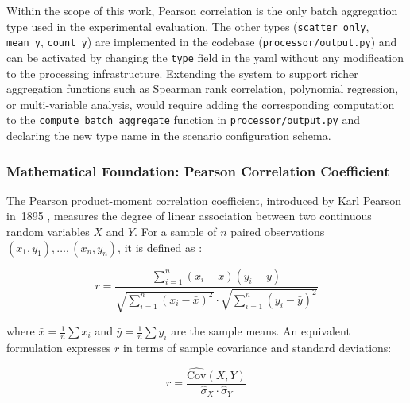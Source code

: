 Within the scope of this work, Pearson correlation is the only batch aggregation type
used in the experimental evaluation.  The other types (\texttt{scatter\_only}, \texttt{mean\_y},
\texttt{count\_y}) are implemented in the codebase (\texttt{processor/output.py}) and can be
activated by changing the \texttt{type} field in the \gls{yaml} without any modification to the
processing infrastructure.  Extending the system to support richer aggregation functions  
such as Spearman rank correlation, polynomial regression, or multi-variable analysis, would
require adding the corresponding computation to the \texttt{compute\_batch\_aggregate} function
in \texttt{processor/output.py} and declaring the new type name in the scenario configuration
schema.

\subsubsection{Mathematical Foundation: Pearson Correlation Coefficient}
\label{subsec:pearson-theory}

\begin{sloppypar}
The Pearson product-moment correlation coefficient, introduced by Karl Pearson in~1895
\parencite{pearson1895notes}, measures the degree of linear association between two
continuous random variables $X$ and $Y$.  For a sample of $n$ paired observations
$(x_1, y_1), \ldots, (x_n, y_n)$, it is defined as \parencite{montgomery2014statistics}:
\end{sloppypar}

\begin{equation}
\label{eq:pearson-r}
r = \frac{\displaystyle\sum_{i=1}^{n}(x_i - \bar{x})(y_i - \bar{y})}
         {\displaystyle\sqrt{\sum_{i=1}^{n}(x_i - \bar{x})^2}
          \cdot
          \sqrt{\sum_{i=1}^{n}(y_i - \bar{y})^2}}
\end{equation}

where $\bar{x} = \tfrac{1}{n}\sum x_i$ and $\bar{y} = \tfrac{1}{n}\sum y_i$ are the sample
means.  An equivalent formulation expresses $r$ in terms of sample covariance and standard
deviations:

\begin{equation}
\label{eq:pearson-cov}
r = \frac{\hat{\text{Cov}}(X, Y)}{\hat{\sigma}_X \cdot \hat{\sigma}_Y}
\end{equation}

